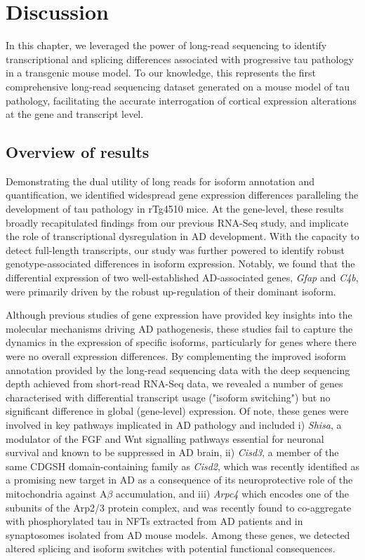 \clearpage
\section{Discussion}

In this chapter, we leveraged the power of long-read sequencing to identify transcriptional and splicing differences associated with progressive tau pathology in a transgenic mouse model. To our knowledge, this represents the first comprehensive long-read sequencing dataset generated on a mouse model of tau pathology, facilitating the accurate interrogation of cortical expression alterations at the gene and transcript level. 

\subsection{Overview of results}
Demonstrating the dual utility of long reads for isoform annotation and quantification, we identified widespread gene expression differences paralleling the development of tau pathology in rTg4510 mice. At the gene-level, these results broadly recapitulated findings from our previous RNA-Seq study\cite{Castanho2020}, and implicate the role of transcriptional dysregulation in AD development. With the capacity to detect full-length transcripts, our study was further powered to identify robust genotype-associated differences in isoform expression. Notably, we found that the differential expression of two well-established AD-associated genes, \textit{Gfap} and \textit{C4b}, were primarily driven by the robust up-regulation of their dominant isoform. 

Although previous studies of gene expression have provided key insights into the molecular mechanisms driving AD pathogenesis\cite{Castanho2020,Salih2019,Annese2018,Magistri2015}, these studies fail to capture the dynamics in the expression of specific isoforms, particularly for genes where there were no overall expression differences. By complementing the improved isoform annotation provided by the long-read sequencing data with the deep sequencing depth achieved from short-read RNA-Seq data, we revealed a number of genes characterised with differential transcript usage ("isoform switching") but no significant difference in global (gene-level) expression. Of note, these genes were involved in key pathways implicated in AD pathology and included i) \textit{Shisa}, a modulator of the FGF and Wnt signalling pathways essential for neuronal survival and known to be suppressed in AD brain\cite{Jia2019}, ii) \textit{Cisd3}, a member of the same CDGSH domain-containing family as \textit{Cisd2}, which was recently identified as a promising new target in AD as a consequence of its neuroprotective role of the mitochondria against A$\beta$ accumulation\cite{Chen2020}, and iii) \textit{Arpc4} which encodes one of the subunits of the Arp2/3 protein complex, and was recently found to co-aggregate with phosphorylated tau in NFTs extracted from AD patients\cite{Drummond2020} and in synaptosomes isolated from AD mouse models\cite{Li2020a}. Among these genes, we detected altered splicing and isoform switches with potential functional consequences.  
  
